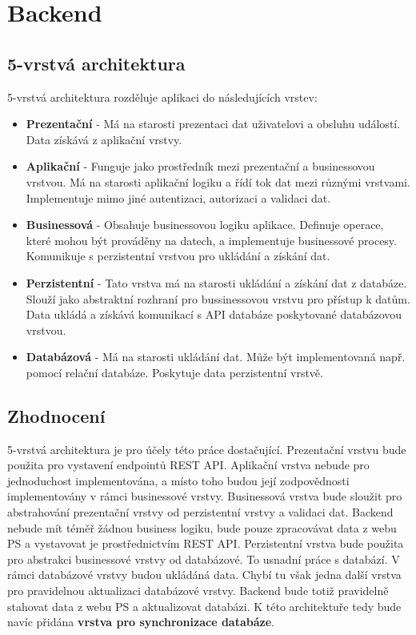 \section{Backend}

\subsection{5-vrstvá architektura}
5-vrstvá architektura \cite{5-tier} rozděluje aplikaci do následujících vrstev:


\begin{itemize}
	\item \textbf{Prezentační} - Má na starosti prezentaci dat uživatelovi a obsluhu událostí. Data získává z aplikační vrstvy.
	
	\item \textbf{Aplikační} - Funguje jako prostředník mezi prezentační a businessovou vrstvou. Má na starosti aplikační logiku a řídí tok dat mezi různými vrstvami. Implementuje mimo jiné autentizaci, autorizaci a validaci dat.
	
	\item \textbf{Businessová} - Obsahuje businessovou logiku aplikace. Definuje operace, které mohou být prováděny na datech, a implementuje businessové procesy. Komunikuje s perzistentní vrstvou pro ukládání a získání dat.	
	
	\item \textbf{Perzistentní} - Tato vrstva má na starosti ukládání a získání dat z databáze. Slouží jako abstraktní rozhraní pro bussinessovou vrstvu pro přístup k datům. Data ukládá a získává komunikací s API databáze poskytované databázovou vrstvou.
	
	\item \textbf{Databázová} - Má na starosti ukládání dat. Může být implementovaná např. pomocí relační databáze. Poskytuje data perzistentní vrstvě.
	
\end{itemize}

\subsection{Zhodnocení}
5-vrstvá architektura je pro účely této práce dostačující. Prezentační vrstvu bude použita pro vystavení endpointů REST API. Aplikační vrstva nebude pro jednoduchost implementována, a místo toho budou její zodpovědnosti implementovány v rámci businessové vrstvy. Businessová vrstva bude sloužit pro abstrahování prezentační vrstvy od perzistentní vrstvy a validaci dat. Backend nebude mít téměř žádnou business logiku, bude pouze zpracovávat data z webu PS a vystavovat je prostřednictvím REST API. Perzistentní vrstva bude použita pro abstrakci businessové vrstvy od databázové. To usnadní práce s databází. V rámci databázové vrstvy budou ukládáná data. Chybí tu však jedna další vrstva pro pravidelnou aktualizaci databázové vrstvy. Backend bude totiž pravidelně stahovat data z webu PS a aktualizovat databázi. K této architektuře tedy bude navíc přidána \textbf{vrstva pro synchronizace databáze}.


